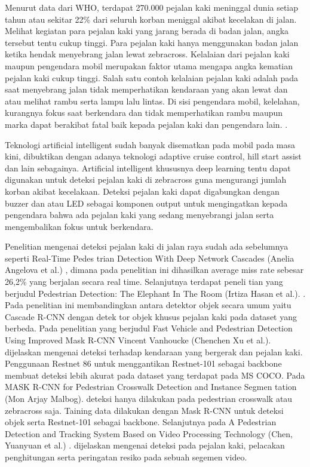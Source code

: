 \documentclass[conference]{IEEEtran}
\begin{document}
	Menurut data dari WHO, terdapat 270.000 pejalan kaki meninggal dunia setiap tahun atau sekitar 22\% dari seluruh korban meniggal akibat kecelakan di jalan. Melihat kegiatan para pejalan kaki yang jarang berada di badan jalan, angka tersebut tentu cukup tinggi. Para pejalan kaki hanya menggunakan badan jalan ketika hendak menyebrang jalan lewat zebracross. Kelalaian dari pejalan kaki maupun pengendara mobil merupakan faktor utama mengapa angka kematian pejalan kaki cukup tinggi. Salah satu contoh kelalaian pejalan kaki adalah pada saat menyebrang jalan tidak memperhatikan kendaraan yang akan lewat dan atau melihat rambu serta lampu lalu lintas. Di sisi pengendara mobil, kelelahan, kurangnya fokus saat berkendara dan tidak memperhatikan rambu maupun marka dapat berakibat fatal baik kepada pejalan kaki dan pengendara lain. \cite{cit:4}.
	
	\vspace{1ex}
	
	Teknologi artificial intelligent sudah banyak disematkan pada mobil pada masa kini, dibuktikan dengan adanya teknologi adaptive cruise control, hill start assist dan lain sebagainya. Artificial intelligent khususnya deep learning tentu dapat digunakan untuk deteksi pejalan kaki di zebracross guna mengurangi jumlah korban akibat kecelakaan. Deteksi pejalan kaki dapat digabungkan dengan buzzer dan atau LED sebagai komponen output untuk mengingatkan kepada pengendara bahwa ada pejalan kaki yang sedang menyebrangi jalan serta mengembalikan fokus untuk berkendara.
	
	\vspace{1ex} 
	
	Penelitian mengenai deteksi pejalan kaki di jalan raya sudah ada sebelumnya seperti Real-Time Pedes trian Detection With Deep Network Cascades (Anelia Angelova et al.) \cite{cit:1}, dimana pada penelitian ini dihasilkan average miss rate sebesar 26,2\% yang berjalan secara real time. Selanjutnya terdapat peneli tian yang berjudul Pedestrian Detection: The Elephant In The Room (Irtiza Hasan et al.). \cite{cit:2}. Pada penelitian ini membandingkan antara detektor objek secara umum yaitu Cascade R-CNN dengan detek tor objek khusus pejalan kaki pada dataset yang berbeda. Pada penelitian yang berjudul Fast Vehicle and Pedestrian Detection Using Improved Mask R-CNN Vincent Vanhoucke (Chenchen Xu et al.). \cite{cit:3} dijelaskan mengenai deteksi terhadap kendaraan yang bergerak dan pejalan kaki. Penggunaan Restnet 86 untuk menggantikan Restnet-101 sebagai backbone membuat deteksi lebih akurat pada dataset yang terdapat pada MS COCO. Pada MASK R-CNN for Pedestrian Crosswalk Detection and Instance Segmen tation (Mon Arjay Malbog). \cite{cit:4} deteksi hanya dilakukan pada pedestrian crosswalk atau zebracross saja. Taining data dilakukan dengan Mask R-CNN untuk deteksi objek serta Restnet-101 sebagai backbone. Selanjutnya pada A Pedestrian Detection and Tracking System Based on Video Processing Technology (Chen, Yuanyuan et al.) \cite{cit:5}. dijelaskan mengenai deteksi pada pejalan kaki, pelacakan penghitungan serta peringatan resiko pada sebuah segemen video. 
	
\end{document}
